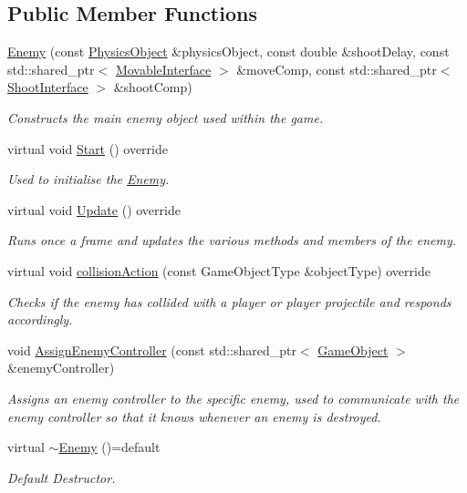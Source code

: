 \subsection*{Public Member Functions}
\begin{DoxyCompactItemize}
\item 
\hyperlink{class_enemy_a0e382a7495bdbb9b802d1ed3931b4fc1}{Enemy} (const \hyperlink{class_physics_object}{Physics\+Object} \&physics\+Object, const double \&shoot\+Delay, const std\+::shared\+\_\+ptr$<$ \hyperlink{class_movable_interface}{Movable\+Interface} $>$ \&move\+Comp, const std\+::shared\+\_\+ptr$<$ \hyperlink{class_shoot_interface}{Shoot\+Interface} $>$ \&shoot\+Comp)
\begin{DoxyCompactList}\small\item\em Constructs the main enemy object used within the game. \end{DoxyCompactList}\item 
virtual void \hyperlink{class_enemy_a64ee0cc6fb8a3424d486537efb8205d8}{Start} () override
\begin{DoxyCompactList}\small\item\em Used to initialise the \hyperlink{class_enemy}{Enemy}. \end{DoxyCompactList}\item 
\mbox{\label{class_enemy_a614ad271f07ecf63cb3e665155b7e258}} 
virtual void \hyperlink{class_enemy_a614ad271f07ecf63cb3e665155b7e258}{Update} () override
\begin{DoxyCompactList}\small\item\em Runs once a frame and updates the various methods and members of the enemy. \end{DoxyCompactList}\item 
virtual void \hyperlink{class_enemy_ac59660a58fac8d0ffdcb97c0717fa089}{collision\+Action} (const Game\+Object\+Type \&object\+Type) override
\begin{DoxyCompactList}\small\item\em Checks if the enemy has collided with a player or player projectile and responds accordingly. \end{DoxyCompactList}\item 
void \hyperlink{class_enemy_a7fc3561fe6b79712b51bd06fa8ce24d0}{Assign\+Enemy\+Controller} (const std\+::shared\+\_\+ptr$<$ \hyperlink{class_game_object}{Game\+Object} $>$ \&enemy\+Controller)
\begin{DoxyCompactList}\small\item\em Assigns an enemy controller to the specific enemy, used to communicate with the enemy controller so that it knows whenever an enemy is destroyed. \end{DoxyCompactList}\item 
\mbox{\label{class_enemy_aafb628c66008e33afdd750e2f492bd98}} 
virtual \hyperlink{class_enemy_aafb628c66008e33afdd750e2f492bd98}{$\sim$\+Enemy} ()=default
\begin{DoxyCompactList}\small\item\em Default Destructor. \end{DoxyCompactList}\end{DoxyCompactItemize}
